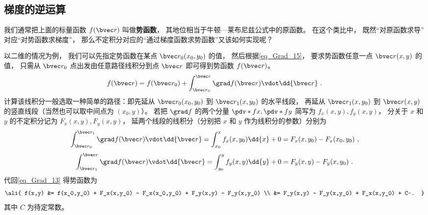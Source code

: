 \subsection{梯度的逆运算}

我们通常把上面的标量函数 $f(\bvec r)$ 叫做\textbf{势函数}， 其地位相当于牛顿—莱布尼兹公式中的原函数。 在这个类比中， 既然“对原函数求导” 对应“对势函数求梯度”， 那么不定积分对应的“通过梯度函数求势函数”又该如何实现呢？

以二维的情况为例， 我们可以先指定势函数在某点 $\bvec r_0 (x_0,y_0)$ 的值， 然后根据\autoref{eq_Grad_15}， 要求势函数任意一点 $\bvec r (x,y)$ 的值， 只需从 $\bvec r_0$ 点出发由任意路径线积分到点 $\bvec r$ 即可得到势函数 $f(\bvec r)$。
\begin{equation}\label{eq_Grad_13}
f(\bvec r) =  f(\bvec r_0) + \int_{\bvec r_0}^{\bvec r} \grad f(\bvec r) \vdot \dd{\bvec r} ~.
\end{equation}
计算该线积分一般选取一种简单的路径：即先延从 $\bvec r_0(x_0,y_0)$ 到 $\bvec r_1(x, y_0)$ 的水平线段， 再延从 $\bvec r_1(x, y_0)$ 到 $\bvec r(x,y)$ 的竖直线段（当然也可以取中间点为 $(x_0,y)$）。 若把 $\grad f$ 的两个分量 $\pdv*{f}{x}, \pdv*{f}{y}$ 简写为 $f_x(x,y), f_y(x,y)$， 分关于 $x$ 和 $y$ 的不定积分记为 $F_x(x,y), F_y(x,y)$， 延两个线段的线积分（分别把 $x$ 和 $y$ 作为线积分的参数）分别为
\begin{equation}
 \int_{\bvec r_0}^{\bvec r_1} \grad f(\bvec r) \vdot \dd{\bvec r} = \int_{x_0}^{x} f_x(x,y_0) \dd{x} + 0 = F_x(x,y_0) - F_x(x_0,y_0)~,
\end{equation}
\begin{equation}
 \int_{\bvec r_1}^{\bvec r} \grad f(\bvec r) \vdot \dd{\bvec r} = \int_{y_0}^{y} f_y(x,y) \dd{y} + 0 = F_y(x,y) - F_y(x,y_0)~.
\end{equation}
代回\autoref{eq_Grad_13} 得势函数为
\begin{equation}\label{eq_Grad_23}\ali{
f(x,y) &= f(x_0,y_0) + F_x(x,y_0) - F_x(x_0,y_0) + F_y(x,y) - F_y(x,y_0) \\
&= F_y(x,y) - F_y(x,y_0) + F_x(x,y_0) + C~.
}\end{equation}
其中 $C$ 为待定常数。
